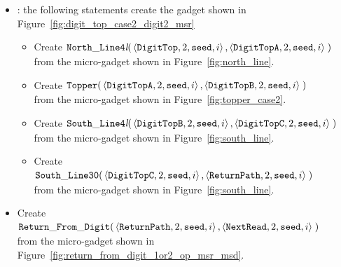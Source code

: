 \begin{itemize}
    \item {\dtop}: the following statements create the gadget shown in Figure~\ref{fig:digit_top_case2_digit2_msr}
        \begin{itemize}
            \item Create
            $\begin{aligned}[t]
                {\tt North\_Line4\textit{l}}(& \left\langle {\tt DigitTop},  2, {\tt seed}, i \right\rangle,
                                               \left\langle {\tt DigitTopA}, 2, {\tt seed}, i \right\rangle\;)
            \end{aligned}$\\ from the micro-gadget shown in Figure~\ref{fig:north_line}.

            \item Create
            $\begin{aligned}[t]
                {\tt Topper}(& \left\langle {\tt DigitTopA}, 2, {\tt seed}, i \right\rangle,
                               \left\langle {\tt DigitTopB}, 2, {\tt seed}, i \right\rangle \;)
            \end{aligned}$\\from the micro-gadget shown in Figure~\ref{fig:topper_case2}.

            \item Create
            $\begin{aligned}[t]
                {\tt South\_Line4\textit{l}}(& \left\langle {\tt DigitTopB}, 2, {\tt seed}, i \right\rangle,
                                               \left\langle {\tt DigitTopC}, 2, {\tt seed}, i \right\rangle \;)
            \end{aligned}$\\from the micro-gadget shown in Figure~\ref{fig:south_line}.

            \item Create
            $\begin{aligned}[t]
                {\tt South\_Line30}(& \left\langle {\tt DigitTopC}, 2, {\tt seed}, i \right\rangle,
                                      \left\langle {\tt ReturnPath},     2, {\tt seed}, i \right\rangle \;)
            \end{aligned}$\\from the micro-gadget shown in Figure~\ref{fig:south_line}.
        \end{itemize}


    \item Create
    $\begin{aligned}[t]
        {\tt Return\_From\_Digit}(& \left\langle {\tt ReturnPath},    2, {\tt seed}, i \right\rangle,
                           \left\langle {\tt NextRead}, 2, {\tt seed}, i \right\rangle \;)
    \end{aligned}$\\from the micro-gadget shown in Figure~\ref{fig:return_from_digit_1or2_op_msr_msd}.


\end{itemize}
